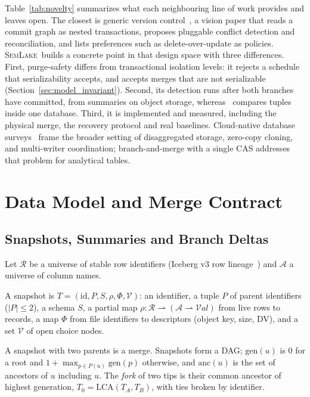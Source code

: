 \documentclass[sigconf, nonacm]{acmart}
\newcommand{\systemname}{\textsc{SemLake}}
\begin{document}
Table~\ref{tab:novelty} summarizes what each neighbouring line of work provides and leaves open. The closest is generic version control~\cite{yilmaz2025gvc}, a vision paper that reads a commit graph as nested transactions, proposes pluggable conflict detection and reconciliation, and lists preferences such as delete-over-update as policies. \systemname\ builds a concrete point in that design space with three differences. First, purge-safety differs from transactional isolation levels: it rejects a schedule that serializability accepts, and accepts merges that are not serializable (Section~\ref{sec:model_invariant}). Second, its detection runs after both branches have committed, from summaries on object storage, whereas~\cite{yilmaz2025gvc} compares tuples inside one database. Third, it is implemented and measured, including the physical merge, the recovery protocol and real baselines. Cloud-native database surveys~\cite{dong2024cloudnative} frame the broader setting of disaggregated storage, zero-copy cloning, and multi-writer coordination; branch-and-merge with a single CAS addresses that problem for analytical tables.

\section{Data Model and Merge Contract}
\label{sec:model}

\subsection{Snapshots, Summaries and Branch Deltas}
\label{sec:model_defs}

Let $\mathcal{R}$ be a universe of stable row identifiers (Iceberg v3 row lineage~\cite{iceberg2025v3}) and $\mathcal{A}$ a universe of column names.

\begin{definition}[Snapshot]
A snapshot is $T = (\text{id}, P, S, \rho, \Phi, \mathcal{V})$: an identifier, a tuple $P$ of parent identifiers ($|P| \le 2$), a schema $S$, a partial map $\rho : \mathcal{R} \rightharpoonup (\mathcal{A} \rightharpoonup \mathcal{V}\!\mathit{al})$ from live rows to records, a map $\Phi$ from file identifiers to descriptors (object key, size, DV), and a set $\mathcal{V}$ of open choice nodes.
\end{definition}

A snapshot with two parents is a merge. Snapshots form a DAG; $\text{gen}(u)$ is $0$ for a root and $1 + \max_{p \in P(u)} \text{gen}(p)$ otherwise, and $\text{anc}(u)$ is the set of ancestors of $u$ including $u$. The \emph{fork} of two tips is their common ancestor of highest generation, $T_0 = \text{LCA}(T_A, T_B)$, with ties broken by identifier.
\end{document}
